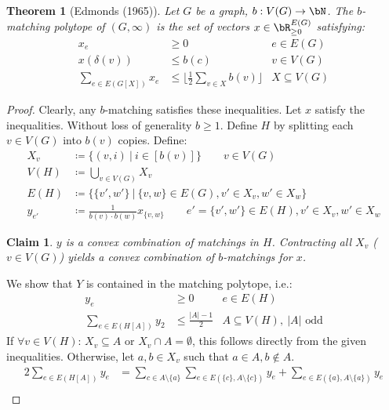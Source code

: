 \documentclass[11pt, a4paper]{article}
\newcommand{\floor}[1]{\lfloor #1 \rfloor}
\newcommand{\abs}[1]{\left\lvert#1\right\rvert}
\newcommand{\set}[1]{\{#1\}}
\newtheorem{theorem}{Theorem}[section]
\newtheorem*{claim}{Claim}
\theoremstyle{remark}
\theoremstyle{definition}
\begin{document}
\begin{theorem}[Edmonds (1965)]
	Let $G$ be a graph, $b: V(G)\to\bN$. The $b$-matching polytope of $(G,\infty)$
	is the set of vectors $x\in \bR^{E(G)}_{\geq0}$ satisfying:
	\begin{align*}
		x_e                    & \geq0                                     & e\in E(G)       \\
		x(\delta(v))           & \leq b(c)                                 & v\in V(G)       \\
		\sum_{e\in E(G[X])}x_e & \leq \floor{\frac{1}{2}\sum_{v\in X}b(v)} & X\subseteq V(G)
	\end{align*}
\end{theorem}
\begin{proof}
	Clearly, any $b$-matching satisfies these inequalities. Let $x$ satisfy
	the inequalities. Without loss of generality $b\geq1$. Define $H$ by
	splitting each $v\in V(G)$ into $b(v)$ copies. Define:
	\begin{align*}
		X_v    & \coloneqq \set{(v,i)\ |\ i\in [b(v)]} \qquad v\in V(G)                                             \\
		V(H)   & \coloneqq \bigcup_{v\in V(G)}X_v                                                                   \\
		E(H)   & \coloneqq \set{\set{v',w'}\ |\ \set{v,w}\in E(G),v'\in X_v,w'\in X_w}                              \\
		y_{e'} & \coloneqq \frac{1}{b(v)\cdot b(w)} x_{\set{v,w}} \qquad e'=\set{v',w'}\in E(H),v'\in X_v,w'\in X_w
	\end{align*}
	\begin{claim}
		$y$ is a convex combination of matchings in $H$. Contracting all $X_v$
		($v\in V(G)$) yields a convex combination of $b$-matchings for $x$.
	\end{claim}
	We show that $Y$ is contained in the matching polytope, i.e.:
	\begin{align*}
		y_e                    & \geq0                    & e\in E(H)                            \\
		\sum_{e\in E(H[A])}y_2 & \leq \frac{\abs{A}-1}{2} & A\subseteq V(H),\ \abs{A}\text{ odd}
	\end{align*}
	If $\forall v\in V(H)$: $X_v\subseteq A$ or $X_v\cap A=\emptyset$, this
	follows directly from the given inequalities. Otherwise, let $a,b\in X_v$
	such that $a\in A,b\notin A$.
	\begin{align*}
		2\sum_{e\in E(H[A])}y_e & =\sum_{c\in A\setminus\set{a}}\sum_{e\in E(\set{c},A\setminus\set{c})}y_e + \sum_{e\in E(\set{a},A\setminus\set{a})}y_e                                              \\

\end{align*}
\end{proof}
\end{document}
